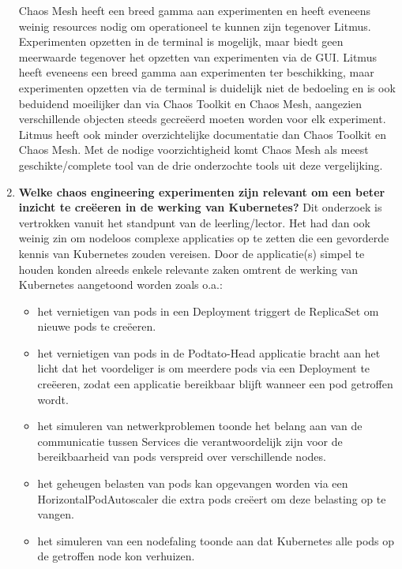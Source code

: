 \begin{enumerate}
\newline Chaos Mesh heeft een breed gamma aan experimenten en heeft eveneens weinig resources nodig om operationeel te kunnen zijn tegenover Litmus. Experimenten opzetten in de terminal is mogelijk, maar biedt geen meerwaarde tegenover het opzetten van experimenten via de GUI. 
\newline Litmus heeft eveneens een breed gamma aan experimenten ter beschikking, maar experimenten opzetten via de terminal is duidelijk niet de bedoeling en is ook beduidend moeilijker dan via Chaos Toolkit en Chaos Mesh, aangezien verschillende objecten steeds gecreëerd moeten worden voor elk experiment. Litmus heeft ook minder overzichtelijke documentatie dan Chaos Toolkit en Chaos Mesh.
\newline Met de nodige voorzichtigheid komt Chaos Mesh als meest geschikte/complete tool van de drie onderzochte tools uit deze vergelijking. 
\newline 
\item {\bf Welke chaos engineering experimenten zijn relevant om een beter inzicht te creëeren in de werking van Kubernetes?}  
\newline Dit onderzoek is vertrokken vanuit het standpunt van de leerling/lector. Het had dan ook weinig zin om nodeloos complexe applicaties op te zetten die een gevorderde kennis van Kubernetes zouden vereisen. Door de applicatie(s) simpel te houden konden alreeds enkele relevante zaken omtrent de werking van Kubernetes aangetoond worden zoals o.a.: 
\begin{itemize}
    \item het vernietigen van pods in een Deployment triggert de ReplicaSet om nieuwe pods te creëeren.
    \item het vernietigen van pods in de Podtato-Head applicatie bracht aan het licht dat het voordeliger is om meerdere pods via een Deployment te creëeren, zodat een applicatie bereikbaar blijft wanneer een pod getroffen wordt.
    \item het simuleren van netwerkproblemen toonde het belang aan van de communicatie tussen Services die verantwoordelijk zijn voor de bereikbaarheid van pods verspreid over verschillende nodes.      
    \item het geheugen belasten van pods kan opgevangen worden via een HorizontalPodAutoscaler die extra pods creëert om deze belasting op te vangen.
    \item het simuleren van een nodefaling toonde aan dat Kubernetes alle pods op de getroffen node kon verhuizen. 
\end{itemize} 
\end{enumerate}